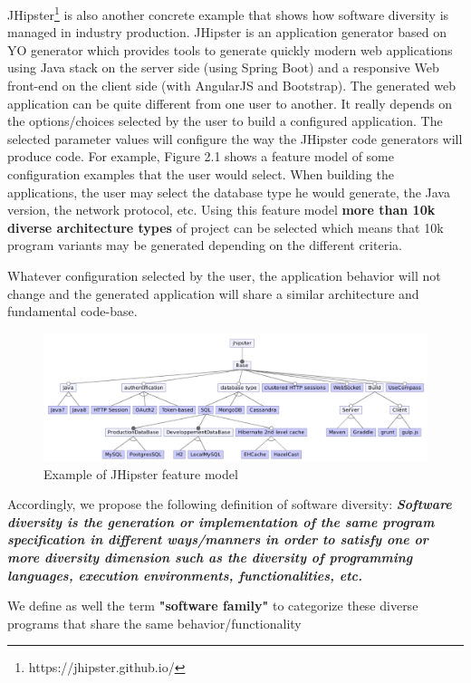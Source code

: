 JHipster\footnote{https://jhipster.github.io/} is also another concrete example that shows how software diversity is managed in industry production. JHipster is an application generator based on YO generator which provides tools to generate quickly modern web applications using Java stack on the server side (using Spring Boot) and a responsive Web front-end on the client side (with AngularJS and Bootstrap).
The generated web application can be quite different from one user to another. It really depends on the options/choices selected by the user to build a configured application. The selected parameter values will configure the way the JHipster code generators will produce code. 
For example, Figure 2.1 shows a feature model of some configuration examples that the user would select. When building the applications, the user may select the database type he would generate, the Java version, the network protocol, etc. 
Using this feature model \textbf{more than 10k diverse architecture types} of project can be selected which means that 10k program variants may be generated depending on the different criteria.

Whatever configuration selected by the user, the application behavior will not change and the generated application will share a similar architecture and fundamental code-base.
\begin{figure}[h]
	\center
	\includegraphics[scale=0.65]{Background/fig/jhipster}
	\caption{Example of JHipster feature model}
\end{figure}



Accordingly, we propose the following definition of software diversity: 
\textit{\textbf{Software diversity is the generation or implementation of the same program specification in different ways/manners in order to satisfy one or more diversity dimension such as the diversity of programming languages, execution environments, functionalities, etc. }}
		
We define as well the term \textbf{"software family"} to categorize these diverse programs that share the same behavior/functionality


